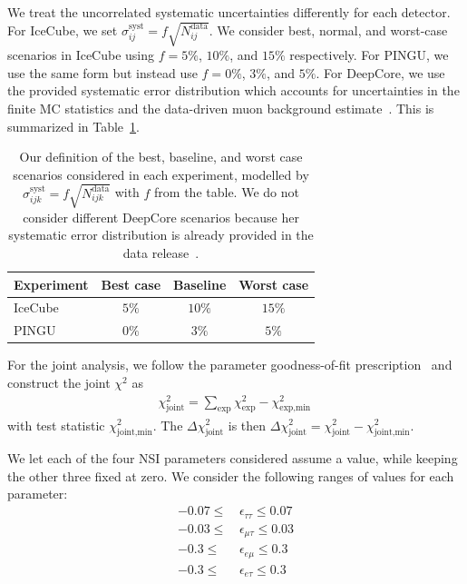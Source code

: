 \documentclass{revtex4-2}
\newcommand{\emt}{\ensuremath{\epsilon_{\mu\tau}}}
\newcommand{\eet}{\epsilon_{e\tau}}
\newcommand{\eem}{\epsilon_{e\mu}}
\newcommand{\ett}{\ensuremath{\epsilon_{\tau\tau}}}
\begin{document}
We treat the uncorrelated systematic uncertainties differently for each detector. For IceCube, we set $\sigma_{ij}^\text{syst} = f\sqrt{N_{ij}^\text{data}}$.
We consider best, normal, and worst-case scenarios in IceCube using
$f=5\%$, $10\%$, and $15\%$ respectively. For PINGU, we use the same form but instead use $f=0\%$, $3\%$, and $5\%$.
For DeepCore, we use the provided systematic error distribution which accounts for uncertainties in the finite MC statistics and the data-driven 
muon background estimate~\cite{DC2019data}. This is summarized in Table~\ref{table:syst_errors}.
{\renewcommand{\arraystretch}{1.2}
\begin{table}
   \centering
   \begin{tabular}{lccc}
      \hline \hline
      Experiment & Best case & Baseline & Worst case \\
      \hline
      IceCube & $5\%$ & $10\%$ & $15\%$ \\
      PINGU & $0\%$ & $3\%$ & $5\%$ \\
      \hline \hline
   \end{tabular}
   \caption{Our definition of the best, baseline, and worst case scenarios considered in each experiment, modelled by $\sigma_{ijk}^\text{syst} = f\sqrt{N_{ijk}^\text{data}}$ with $f$ from the table.
   We do not consider different DeepCore scenarios because her systematic error distribution is already provided in the data release~\cite{DC2019data}.}\label{table:syst_errors}
\end{table}

For the joint analysis, we follow the parameter goodness-of-fit prescription~\cite{maltoni2003} and construct the joint $\chi^2$ as 
\begin{align}\label{eq:joint_chisq}
    \chi^2_\text{joint} = \sum_\text{exp}\chi^2_\text{exp} - \chi^2_\text{exp,min}\,
\end{align}
with test statistic $\chi^2_\text{joint,min}$. The $\Delta \chi^2_\text{joint}$ is then $\Delta \chi^2_\text{joint} = \chi^2_\text{joint} - \chi^2_\text{joint,min}$.

We let each of the four NSI parameters considered assume a value, while keeping the other three fixed at zero. We consider the following ranges of values for each parameter:
\begin{align}
   -0.07 \le &\, \ett \le 0.07 \nonumber \\
   -0.03 \le &\, \emt \le 0.03 \nonumber \\
   -0.3 \le &\, \eem \le 0.3 \nonumber \\
   -0.3 \le &\, \eet \le 0.3 \nonumber \\
\end{align}

}
\end{document}
